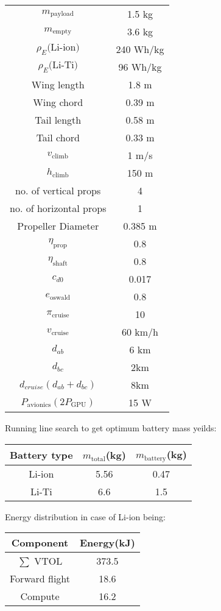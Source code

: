 \begin{center}
    \begin{tabular}{c c}
        $m_\text{payload}$ & 1.5 kg \\
        $m_\text{empty}$ & 3.6 kg \\
        $\rho_E\text{(Li-ion)}$ & 240 Wh/kg\\
        $\rho_E\text{(Li-Ti)}$ & 96 Wh/kg\\
        Wing length & 1.8 m \\
        Wing chord & 0.39 m \\
        Tail length & 0.58 m \\
        Tail chord & 0.33 m\\
        $v_\text{climb}$ & 1 m/s \\
        $h_\text{climb}$ & 150 m\\
        no. of vertical props & 4 \\
        no. of horizontal props & 1 \\
        Propeller Diameter & 0.385 m \\
        $\eta_\text{prop}$ & 0.8 \\
        $\eta_\text{shaft}$ & 0.8 \\
        $c_{d0}$ & 0.017 \\
        $e_\text{oswald}$ & 0.8 \\
        $\pi_\text{cruise}$ & 10 \\
        $v_\text{cruise}$ & 60 km/h \\
        $d_{ab}$ & 6 km \\
        $d_{bc}$ & 2km \\
        $d_{cruise}(d_{ab} + d_{bc})$ & 8km \\
        $P_\text{avionics} (2P_\text{GPU})$ & 15 W\\
    \end{tabular} 
\end{center}

Running line search to get optimum battery mass yeilds:
\begin{center}
    \begin{tabular}{c c c}
        Battery type & $m_\text{total}$(kg) & $m_\text{battery}$(kg) \\
        \hline
        Li-ion & 5.56 & 0.47\\
        Li-Ti & 6.6 & 1.5
    \end{tabular}
\end{center}

Energy distribution in case of Li-ion  being:
\begin{center}
    \begin{tabular}{c c}
        Component & Energy(kJ)\\
        \hline
        $\sum$ VTOL & 373.5\\
        Forward flight & 18.6\\
        Compute & 16.2\\
    \end{tabular}
\end{center}

